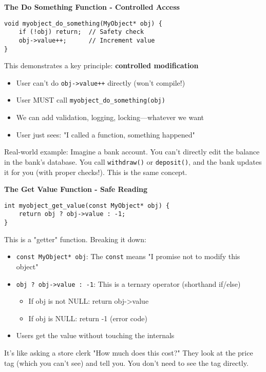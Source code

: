 \textbf{The Do Something Function - Controlled Access}

\begin{lstlisting}
void myobject_do_something(MyObject* obj) {
    if (!obj) return;  // Safety check
    obj->value++;      // Increment value
}
\end{lstlisting}

This demonstrates a key principle: \textbf{controlled modification}

\begin{itemize}
    \item User can't do \texttt{obj->value++} directly (won't compile!)
    \item User MUST call \texttt{myobject\_do\_something(obj)}
    \item We can add validation, logging, locking---whatever we want
    \item User just sees: "I called a function, something happened"
\end{itemize}

Real-world example: Imagine a bank account. You can't directly edit the balance in the bank's database. You call \texttt{withdraw()} or \texttt{deposit()}, and the bank updates it for you (with proper checks!). This is the same concept.

\textbf{The Get Value Function - Safe Reading}

\begin{lstlisting}
int myobject_get_value(const MyObject* obj) {
    return obj ? obj->value : -1;
}
\end{lstlisting}

This is a "getter" function. Breaking it down:

\begin{itemize}
    \item \texttt{const MyObject* obj}: The \texttt{const} means "I promise not to modify this object"
    \item \texttt{obj ? obj->value : -1}: This is a ternary operator (shorthand if/else)
    \begin{itemize}
        \item If obj is not NULL: return obj->value
        \item If obj is NULL: return -1 (error code)
    \end{itemize}
    \item Users get the value without touching the internals
\end{itemize}

It's like asking a store clerk "How much does this cost?" They look at the price tag (which you can't see) and tell you. You don't need to see the tag directly.

